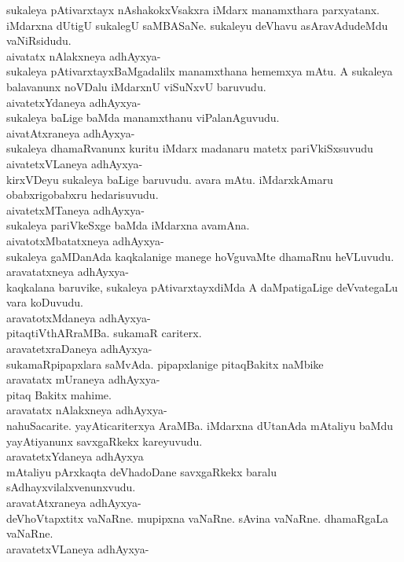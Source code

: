 \documentclass{article}
\begin{document}
sukaleya pAtivarxtayx nAshakokxVsakxra iMdarx manamxthara parxyatanx. iMdarxna dUtigU sukalegU saMBASaNe. sukaleyu deVhavu asAravAdudeMdu vaNiRsidudu.\\
aivatatx nAlakxneya adhAyxya-\\
sukaleya pAtivarxtayxBaMgadalilx manamxthana hememxya mAtu. A sukaleya balavanunx noVDalu iMdarxnU viSuNxvU baruvudu.\\
aivatetxYdaneya adhAyxya-\\
sukaleya baLige baMda manamxthanu viPalanAguvudu.\\
aivatAtxraneya adhAyxya-\\
sukaleya dhamaRvanunx kuritu iMdarx madanaru matetx pariVkiSxsuvudu\\
aivatetxVLaneya adhAyxya-\\
kirxVDeyu sukaleya baLige baruvudu. avara mAtu. iMdarxkAmaru obabxrigobabxru hedarisuvudu.\\
aivatetxMTaneya adhAyxya-\\
sukaleya pariVkeSxge baMda iMdarxna avamAna.\\
aivatotxMbatatxneya adhAyxya-\\
sukaleya gaMDanAda kaqkalanige manege hoVguvaMte dhamaRnu heVLuvudu.\\
aravatatxneya adhAyxya-\\
kaqkalana baruvike, sukaleya pAtivarxtayxdiMda A daMpatigaLige deVvategaLu vara koDuvudu.\\
aravatotxMdaneya adhAyxya-\\
pitaqtiVthARraMBa. sukamaR cariterx.\\
aravatetxraDaneya adhAyxya-\\
sukamaRpipapxlara saMvAda. pipapxlanige pitaqBakitx naMbike\\
aravatatx mUraneya adhAyxya-\\
pitaq Bakitx mahime.\\
aravatatx nAlakxneya adhAyxya-\\
nahuSacarite. yayAticariterxya AraMBa. iMdarxna dUtanAda mAtaliyu baMdu yayAtiyanunx savxgaRkekx kareyuvudu.\\
aravatetxYdaneya adhAyxya\\
mAtaliyu pArxkaqta deVhadoDane savxgaRkekx baralu sAdhayxvilalxvenunxvudu.\\
aravatAtxraneya adhAyxya-\\
deVhoVtapxtitx vaNaRne. mupipxna vaNaRne. sAvina vaNaRne. dhamaRgaLa vaNaRne.\\
aravatetxVLaneya adhAyxya-\\
\end{document}
